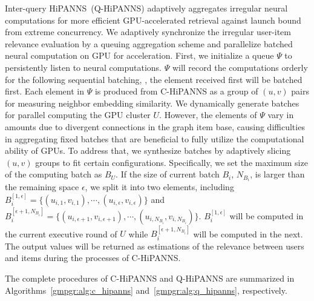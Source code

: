 Inter-query HiPANNS~(Q-HiPANNS) adaptively aggregates irregular neural computations for more efficient GPU-accelerated retrieval against launch bound from extreme concurrency.
We adaptively synchronize the irregular user-item relevance evaluation by a queuing aggregation scheme and parallelize batched neural computation on GPU for acceleration.
First, we initialize a queue $\Psi$ to persistently listen to neural computations. $\Psi$ will record the computations orderly for the following sequential batching, \ie, the element received first will be batched first. Each element in $\Psi$ is produced from C-HiPANNS as a group of $(u,v)$ pairs for measuring neighbor embedding similarity. We dynamically generate batches for parallel computing the GPU cluster $U$.
However, the elements of $\Psi$ vary in amounts due to divergent connections in the graph item base, causing difficulties in aggregating fixed batches that are beneficial to fully utilize the computational ability of GPUs.
To address that, we synthesize batches by adaptively slicing $(u,v)$ groups to fit certain configurations.
Specifically, we set the maximum size of the computing batch as $B_U$. If the size of current batch $B_i$, $N_{B_i}$, is larger than the remaining space $\epsilon$, we split it into two elements, including $B_i^{[1,\epsilon]}=\{(u_{i,1},v_{i,1}),\cdots,(u_{i,\epsilon},v_{i,\epsilon})\}$ and $B_i^{[\epsilon+1,N_{B_i}]}=\{(u_{i,\epsilon+1},v_{i,\epsilon+1}),\cdots,(u_{i,N_{B_i}},v_{i,N_{B_i}})\}$. $B_i^{[1,\epsilon]}$ will be computed in the current executive round of $U$ while $B_i^{[\epsilon+1,N_{B_i}]}$ will be computed in the next.
The output values will be returned as estimations of the relevance between users and items during the processes of C-HiPANNS.

The complete procedures of C-HiPANNS and Q-HiPANNS are summarized in
Algorithms~\ref{gmpgr:alg:c_hipanns} and~\ref{gmpgr:alg:q_hipanns}, respectively.

\begin{algorithm}[t]
    \caption{Inter-candidate HiPANNS.}
    \label{gmpgr:alg:c_hipanns}
    \LinesNumbered
\end{algorithm}

